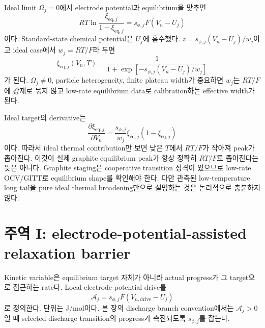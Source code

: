 \documentclass[11pt,a4paper]{article}
\newcommand{\eq}{\mathrm{eq}}
\newcommand{\drive}{\mathrm{drive}}
\begin{document}
Ideal limit $\Omega_j=0$에서 electrode potential과 equilibrium을 맞추면
\begin{equation}
RT\ln\frac{\xi_{\eq,j}}{1-\xi_{\eq,j}}=s_{\phi,j}F(V_n-U_j)
\label{eq:eq_balance}
\end{equation}
이다. Standard-state chemical potential은 $U_j$에 흡수했다. $z=s_{\phi,j}(V_n-U_j)/w_j$이고 ideal case에서
$w_j=RT/F$라 두면
\begin{equation}
\boxed{\;\xi_{\eq,j}(V_n,T)=\frac{1}{1+\exp[-s_{\phi,j}(V_n-U_j)/w_j]}\;}
\label{eq:logistic}
\end{equation}
가 된다. $\Omega_j\ne0$, particle heterogeneity, finite plateau width가 중요하면 $w_j$는 $RT/F$에 강제로 묶지 않고
low-rate equilibrium data로 calibration하는 effective width가 된다.

Ideal target의 derivative는
\begin{equation}
\frac{\partial\xi_{\eq,j}}{\partial V_n}=\frac{s_{\phi,j}}{w_j}\xi_{\eq,j}(1-\xi_{\eq,j})
\label{eq:dxidV}
\end{equation}
이다. 따라서 ideal thermal contribution만 보면 낮은 $T$에서 $RT/F$가 작아져 peak가 좁아진다. 이것이 실제 graphite
equilibrium peak가 항상 정확히 $RT/F$로 좁아진다는 뜻은 아니다. Graphite staging은 cooperative transition 성격이 있으므로
low-rate OCV/GITT로 equilibrium shape를 확인해야 한다. 다만 관측된 low-temperature long tail을 pure ideal thermal broadening만으로
설명하는 것은 논리적으로 충분하지 않다.

\section{주역 I: electrode-potential-assisted relaxation barrier}\label{sec:rate}
Kinetic variable은 equilibrium target 자체가 아니라 actual progress가 그 target으로 접근하는 rate다. Local electrode-potential drive를
\begin{equation}
\mathcal A_j=s_{\phi,j}F(V_{n,\drive}-U_j)
\label{eq:Aj}
\end{equation}
로 정의한다. 단위는 J/mol이다. 본 장의 discharge branch convention에서는 $\mathcal A_j>0$일 때 selected discharge transition의
progress가 촉진되도록 $s_{\phi,j}$를 잡는다.
\end{document}
